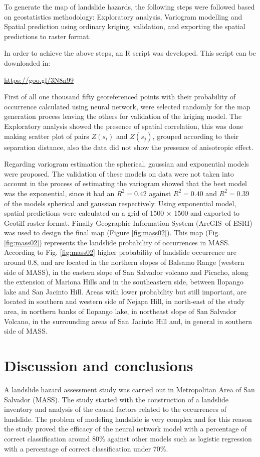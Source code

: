 \documentclass[11pt,twoside]{rmta2010esp}%
\begin{document}
To generate the map of landslide hazards, the following steps were followed based on geostatistics methodology: Exploratory analysis, Variogram modelling and Spatial prediction using ordinary kriging, validation, and exporting the spatial predictions to raster format. 

In order to achieve the above steps, an R script was developed. This script can be downloaded in:

\url{https://goo.gl/3N8n99}

First of all one thousand fifty georeferenced points with their probability of occurrence calculated using neural network, were selected randomly for the map generation process leaving the others for validation of the kriging model. The Exploratory analysis showed the presence of spatial correlation, this was done making scatter plot of pairs $Z(s_{i})$ and  $Z(s_{j})$, grouped according to their separation distance, also the data did not show the presence of anisotropic effect. 

Regarding variogram estimation the spherical, gaussian and exponential models were proposed. The validation of these models on data were not taken into account in the process of estimating the variogram showed that the best model was the exponential, since it had an $ R^{2} = 0.42 $ against $ R^{2} = 0.40 $ and $ R^{2} = 0.39 $ of the models spherical and gaussian respectively. Using exponential model, spatial predictions were calculated on a grid of 1500 $\times$ 1500 and exported to Geotiff raster format. Finally Geographic Information System (ArcGIS\textregistered \  of ESRI) was used to design the final map (Figure \ref{fig:mass02}). This map (Fig. \ref{fig:mass02}) represents the landslide probability of occurrences in MASS. According to Fig. \ref{fig:mass02} higher probability of landslide occurrence are around 0.8, and are located in the northern slopes of Balsamo Range (western side of MASS), in the eastern slope of San Salvador volcano and Picacho,  along the extension of Mariona Hills  and in the southeastern side, between Ilopango lake and San Jacinto Hill. Areas with lower probability but still important, are located in southern and western side of Nejapa Hill, in north-east of the study area, in northern banks of Ilopango lake, in northeast slope of San Salvador Volcano, in the surrounding areas of San Jacinto Hill and, in general in southern side of MASS. 





\section{Discussion and conclusions}
A landslide hazard assessment study was carried out in Metropolitan Area of San Salvador (MASS). The study started with the construction of a landslide inventory and analysis of the causal factors related to the occurrences of landslide. The problem of modeling landslide is very complex and for this reason the study proved the efficacy of the neural network model with a percentage of correct classification around 80\% against other models such as logistic regression with a percentage of correct classification under 70\%. 
\end{document}
